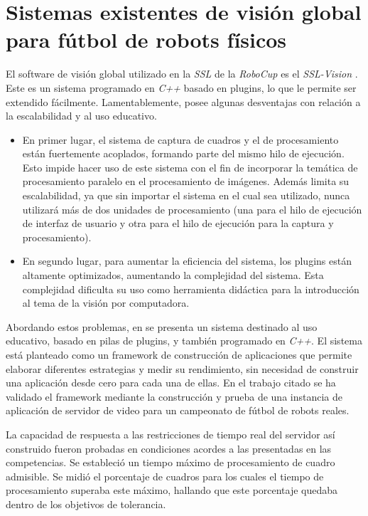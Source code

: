 
\section{Sistemas existentes de visión global para fútbol de robots físicos}

\label{svgExistentes}

El software de visión global utilizado en la \emph{SSL} de la \emph{RoboCup} es
el \emph{SSL-Vision} \cite{sslvision}. Este es un sistema programado en
\emph{C++} basado en plugins, lo que le permite ser extendido fácilmente.
Lamentablemente, posee algunas desventajas con relación a la escalabilidad y al
uso educativo.

\begin{itemize}

	\item 	En primer lugar, el sistema de captura de cuadros y el de
		procesamiento están fuertemente acoplados, formando parte del
		mismo hilo de ejecución. Esto impide hacer uso de este sistema
		con el fin de incorporar la temática de procesamiento paralelo
		en el procesamiento de imágenes. Además limita su escalabilidad,
		ya que sin importar el sistema en el cual sea utilizado, nunca
		utilizará más de dos unidades de procesamiento (una para el hilo
		de ejecución de interfaz de usuario y otra para el hilo de
		ejecución para la captura y procesamiento).

	\item 	En segundo lugar, para aumentar la eficiencia del sistema, los
		plugins están altamente optimizados, aumentando la complejidad
		del sistema. Esta complejidad dificulta su uso como herramienta
		didáctica para la introducción al tema de la visión por
		computadora.

\end{itemize}

Abordando estos problemas, en \cite{torres2014} se presenta un sistema destinado
al uso educativo, basado en pilas de plugins, y también programado en
\emph{C++}. El sistema está planteado como un framework de construcción de
aplicaciones que permite elaborar diferentes estrategias y medir su rendimiento,
sin necesidad de construir una aplicación desde cero para cada una de ellas. En
el trabajo citado se ha validado el framework mediante la construcción y prueba
de una instancia de aplicación de servidor de video para un campeonato de fútbol
de robots reales.

La capacidad de respuesta a las restricciones de tiempo real del servidor así
construido fueron probadas en condiciones acordes a las presentadas en las
competencias. Se estableció un tiempo máximo de procesamiento de cuadro
admisible. Se midió el porcentaje de cuadros para los cuales el tiempo de
procesamiento superaba este máximo, hallando que este porcentaje quedaba dentro
de los objetivos de tolerancia.

